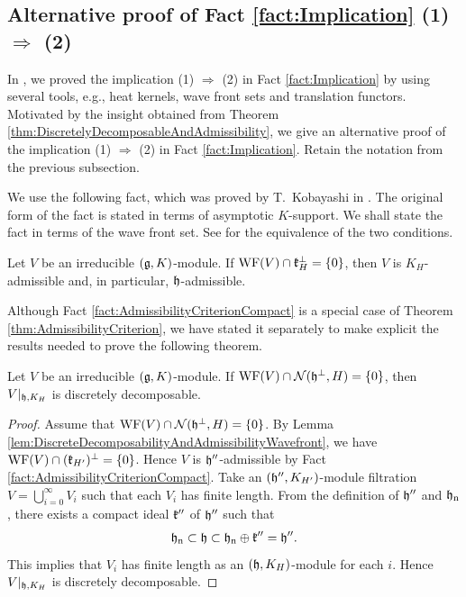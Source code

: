 \subsection{Alternative proof of Fact \ref{fact:Implication} \texorpdfstring{(1) $\Rightarrow$ (2)}{(1) => (2)}}

In \cite{Ki24}, we proved the implication (1) $\Rightarrow$ (2) in Fact \ref{fact:Implication} by using several tools, e.g., heat kernels, wave front sets and translation functors.
Motivated by the insight obtained from Theorem \ref{thm:DiscretelyDecomposableAndAdmissibility}, we give an alternative proof of the implication (1) $\Rightarrow$ (2) in Fact \ref{fact:Implication}.
Retain the notation from the previous subsection.

We use the following fact, which was proved by T.\ Kobayashi in \cite[Theorem 2.9]{Ko98_discrete_decomposable_2}.
The original form of the fact is stated in terms of asymptotic $K$-support.
We shall state the fact in terms of the wave front set.
See \cite[Corollary 9]{Ki24} for the equivalence of the two conditions.

\begin{fact} \label{fact:AdmissibilityCriterionCompact}
	Let $V$ be an irreducible $(\mathfrak{g}, K)$-module.
	If $\mathrm{WF}(V) \cap \mathfrak{k}_{H}^\perp = \left\{0 \right\}$, then $V$ is $K_{H}$-admissible and, in particular, $\mathfrak{h}$-admissible.
\end{fact}

Although Fact \ref{fact:AdmissibilityCriterionCompact} is a special case of Theorem \ref{thm:AdmissibilityCriterion}, we have stated it separately to make explicit the results needed to prove the following theorem.

\begin{theorem}
	Let $V$ be an irreducible $(\mathfrak{g}, K)$-module.
	If $\mathrm{WF}(V) \cap \mathcal{N}(\mathfrak{h}^\perp, H) = \left\{0 \right\}$, then $V|_{\mathfrak{h}, K_H}$ is discretely decomposable.
\end{theorem}

\begin{proof}
	Assume that $\mathrm{WF}(V) \cap \mathcal{N}(\mathfrak{h}^\perp, H) = \left\{0 \right\}$.
	By Lemma \ref{lem:DiscreteDecomposabilityAndAdmissibilityWavefront}, we have $\mathrm{WF}(V) \cap (\mathfrak{k}_{H'})^\perp = \left\{0 \right\}$.
	Hence $V$ is $\mathfrak{h}''$-admissible by Fact \ref{fact:AdmissibilityCriterionCompact}.
	Take an $(\mathfrak{h}'', K_{H'})$-module filtration $V = \bigcup_{i=0}^\infty V_i$ such that each $V_i$ has finite length.
	From the definition of $\mathfrak{h}''$ and $\mathfrak{h}_{\mathrm{n}}$, there exists a compact ideal $\mathfrak{k}''$ of $\mathfrak{h}''$ such that
	\begin{align*}
		\mathfrak{h}_{\mathrm{n}} \subset \mathfrak{h} \subset \mathfrak{h}_{\mathrm{n}} \oplus \mathfrak{k}'' = \mathfrak{h}''.
	\end{align*}
	This implies that $V_i$ has finite length as an $(\mathfrak{h}, K_{H})$-module for each $i$.
	Hence $V|_{\mathfrak{h}, K_H}$ is discretely decomposable.
\end{proof}